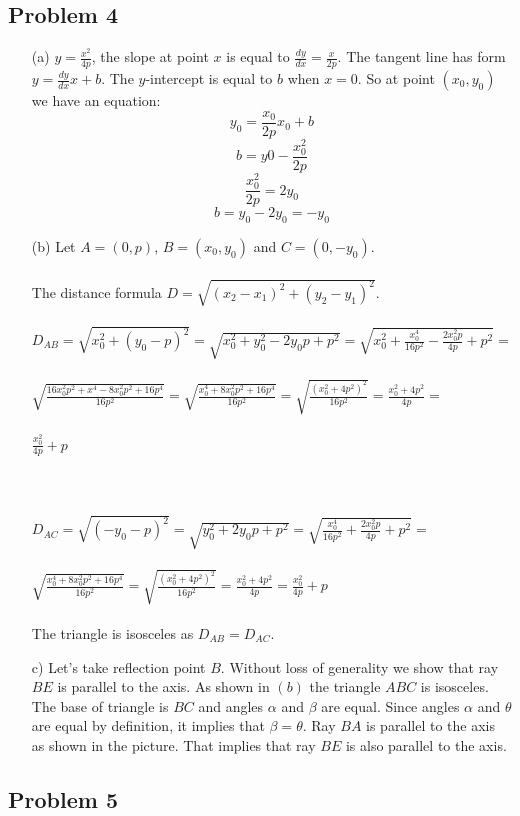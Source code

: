 \documentclass{article}
\begin{document}
\subsection{Problem 4}
\begin{itemize}
 \item[(a)] $y = \frac{x^2}{4p}$, the slope at point $x$ is equal to $\frac{dy}{dx} = \frac{x}{2p}$.
 The tangent line has form $y = \frac{dy}{dx}x + b$. The $y$-intercept is equal to $b$ when $x = 0$. So at point $(x_0, y_0)$ we have an equation:
 \[ y_0 = \frac{x_0}{2p}x_0 + b \]
 \[ b = y0 - \frac{x_0^2}{2p} \]
 \[ \frac{x_0^2}{2p} = 2y_0 \]
 \[ b = y_0 - 2y_0 = -y_0 \]

\item[(b)] Let $A = (0,p)$, $B = (x_0, y_0)$ and $C = (0, -y_0)$.\\
\\
The distance formula $D = \sqrt{(x_2 - x_1)^2 + (y_2 - y_1)^2}$. 
\\ \\
$D_{AB} = \sqrt{x_0^2 + (y_0-p)^2} = \sqrt{x_0^2 + y_0^2 - 2y_0p + p^2} = \sqrt{x_0^2+\frac{x_0^4}{16p^2}-\frac{2x_0^2p}{4p}+p^2} =$ \\ \\ $\sqrt{\frac{16x_0^2p^2+x^4-8x_0^2p^2+16p^4}{16p^2}} = \sqrt{\frac{x_0^4+8x_0^2p^2+16p^4}{16p^2}} = \sqrt{\frac{(x_0^2+4p^2)^2} {16p^2}}=\frac{x_0^2+4p^2}{4p} = $ \\ \\ $\frac{x_0^2}{4p}+p$ \\ \\ \\ \\
$D_{AC} = \sqrt{(-y_0-p)^2} = \sqrt{y_0^2 + 2y_0p + p^2} = \sqrt{\frac{x_0^4}{16p^2} + \frac{2x_0^2p}{4p} + p^2} = $
\\ \\
$\sqrt{\frac{x_0^4+8x_0^2p^2+16p^4}{16p^2}} = \sqrt{\frac{(x_0^2+4p^2)^2}{16p^2}} = \frac{x_0^2+4p^2}{4p} = \frac{x_0^2}{4p} + p$ \\ \\

The triangle is isosceles as $D_{AB} = D_{AC}$.
\newpage
\item[c)]
Let's take reflection point $B$. Without loss of generality we show that ray $BE$ is parallel to the axis. As shown in $(b)$ the triangle $ABC$ is isosceles. The base of triangle is $BC$ and angles $\alpha$ and $\beta$ are equal. Since angles $\alpha$ and $\theta$ are equal by definition, it implies that $\beta = \theta$. Ray $BA$ is parallel to the axis as shown in the picture. That implies that ray $BE$ is also parallel to the axis. 
\begin{figure}
    \centering
    
    \label{fig:enter-label}
\end{figure}
\end{itemize}

\subsection{Problem 5}
\end{document}
